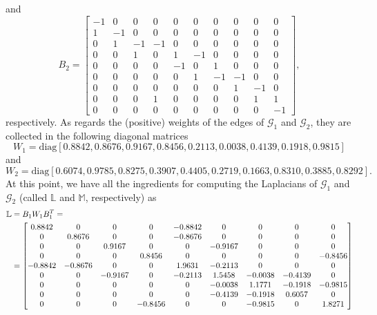 \documentclass[a4paper]{article}
\theoremstyle{plain}
\newcommand{\matr}[1]{
\begin{bmatrix}
    #1
\end{bmatrix}
}
\begin{document}
and
\begin{equation*}
B_2 = \matr{
	-1&	0&	0&	0&	0&	0&	0&	0&	0&	0\\
	1&	-1&	0&	0&	0&	0&	0&	0&	0&	0\\
	0&	1&	-1&	-1&	0&	0&	0&	0&	0&	0\\
	0&	0&	1&	0&	1&	-1&	0&	0&	0&	0\\
	0&	0&	0&	0&	-1&	0&	1&	0&	0&	0\\
	0&	0&	0&	0&	0&	1&	-1&	-1&	0&	0\\
	0&	0&	0&	0&	0&	0&	0&	1&	-1&	0\\
	0&	0&	0&	1&	0&	0&	0&	0&	1&	1\\
	0&	0&	0&	0&	0&	0&	0&	0&	0&	-1
},
\end{equation*}
respectively. As regards the (positive) weights of the edges of $\mathcal{G}_1$ and $\mathcal{G}_2$, they are collected in the following diagonal matrices
\[W_1 = \mathrm{diag}[0.8842, 0.8676, 0.9167, 0.8456, 0.2113, 0.0038, 0.4139, 0.1918, 0.9815]\]
and
\small
\[W_2 = \mathrm{diag}[0.6074, 0.9785, 0.8275, 0.3907, 0.4405, 0.2719, 0.1663, 0.8310, 0.3885, 0.8292].\]
\normalsize
At this point, we have all the ingredients for computing the Laplacians of $\mathcal{G}_1$ and $\mathcal{G}_2$ (called $\mathbb{L}$ and $\mathbb{M}$, respectively) as
\begin{equation*}
\begin{aligned}
\mathbb{L} &= B_1 W_1 B_1^T = \\
&=\matr{    0.8842    &     0     &    0     &    0  & -0.8842      &   0    &  0   &      0      &   0\\
	0  &  0.8676   &      0     &    0  & -0.8676    &     0   &      0    &     0    &     0\\
	0     &    0  &  0.9167  &       0     &    0  & -0.9167    &     0    &     0   &      0\\
	0     &    0  &       0  & 0.8456    &     0   &      0     &    0     &    0  & -0.8456\\
	-0.8842  & -0.8676  &       0   &     0  &  1.9631  & -0.2113  &       0    &     0    &     0\\
	0    &     0  & -0.9167    &     0 &  -0.2113  &  1.5458  & -0.0038 &  -0.4139  &       0\\
	0    &     0   &      0     &    0   &      0 &  -0.0038  &  1.1771 &  -0.1918 &  -0.9815\\
	0    &     0   &      0     &    0   &      0 &  -0.4139  & -0.1918 &   0.6057 &        0\\
	0    &    0    &     0   &-0.8456    &     0   &      0  & -0.9815  &       0  &  1.8271 }
\end{aligned}
\normalsize
\end{equation*}
\end{document}
